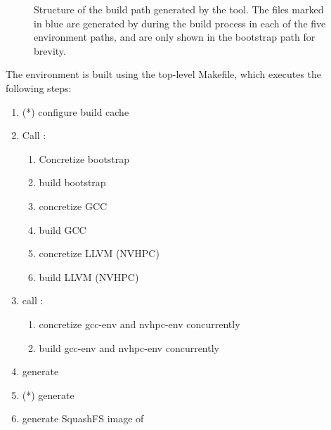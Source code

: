 \begin{figure}[htp!]
    
    \caption{Structure of the build path generated by the \stackinator tool. The files marked in blue are generated by \spack during the build process in each of the five environment paths, and are only shown in the bootstrap path for brevity.}
    \label{fig:build-tree}
\end{figure}

The environment is built using the top-level Makefile, which executes the following steps:
\begin{enumerate}
    \item (*) configure build cache
    \item Call :
    \begin{enumerate}
        \item Concretize bootstrap
        \item build bootstrap
        \item concretize GCC
        \item build GCC
        \item concretize LLVM (NVHPC)
        \item build LLVM (NVHPC)
    \end{enumerate}
    \item call :
    \begin{enumerate}
        \item concretize gcc-env and nvhpc-env concurrently
        \item build gcc-env and nvhpc-env concurrently
    \end{enumerate}
    \item generate 
    \item (*) generate 
    \item generate SquashFS image of 
\end{enumerate}

